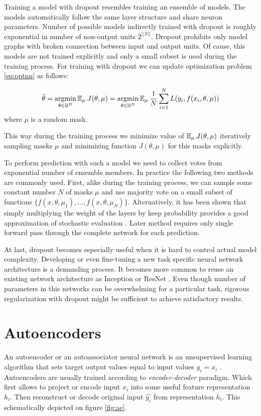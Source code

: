 Training a model with dropout resembles training an ensemble of models. The models automatically follow the same layer structure and share neuron parameters. Number of possible models indirectly trained with dropout is roughly exponential in number of non-output units $2^{||N||}$. Dropout prohibits only model graphs with broken connection between input and output units. Of cause, this models are not trained explicitly and only a small subset is used during the training process. For training with dropout we can update optimization problem \ref{eq:optnn} as follows:

\begin{equation}\label{eq:optnndo}
  \hat{\theta} = \operatorname*{argmin}_{\theta \in \Bbb{R}^D} \operatorname{\mathbb{E}}_\mu J(\theta, \mu) = \operatorname*{argmin}_{\theta \in \Bbb{R}^D} \operatorname{\mathbb{E}}_\mu \frac{1}{N} \sum_{i=1}^{N} L(y_i, f(x_i, \theta, \mu))
\end{equation}
where $\mu$ is a random mask.

This way during the training process we minimize value of $\operatorname{\mathbb{E}}_\mu J(\theta, \mu)$ iteratively sampling masks $\mu$ and minimizing function $J(\theta, \mu)$ for this masks explicitly.

To perform prediction with such a model we need to collect votes from exponential number of ensemble members.
In practice the following two methods are commonly used. First, alike during the training process, we can sample some constant number $N$ of masks $\mu$ and use majority vote on a small subset of functions $\{f(x, \theta, \mu_1), \ldots, f(x, \theta, \mu_N)\}$. Alternatively, it has been shown that simply multiplying the weight of the layers by keep probability provides a good approximation of stochastic evaluation \cite{Srivastava2014}. Later method requires only single forward pass through the complete network for each prediction.

At last, dropout becomes especially useful when it is hard to control actual model complexity. Developing or even fine-tuning a new task specific neural network architecture is a demanding process. It becomes more common to reuse an existing network architecture as Inception or ResNet \cite{He2015, Szegedy2016}. Even though number of parameters in this networks can be overwhelming for a particular task, rigorous regularization with dropout might be sufficient to achieve satisfactory results.


\section{Autoencoders}\label{ch:ae}
An autoencoder or an autoassociator neural network is an unsupervised learning algorithm that sets target output values equal to input values $y_i=x_i$ \cite{Ng2011,RanzatoMarcAurelio2007}.
Autoencoders are usually trained according to \textit{encoder-decoder} paradigm.
Which first allows to project or encode input $x_i$ into some useful feature representation $h_i$.
Then reconstruct or decode original input $\hat{y_i}$ from representation $h_i$.
This schematically depicted on figure \ref{fig:ae}.


